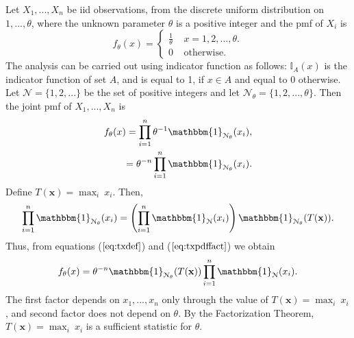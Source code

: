 \documentclass[a4paper,english,12pt]{article}
\newcommand{\bx}{\mathbf{x}}
\begin{document}
\begin{exmp}
Let $X_1,...,X_n$ be iid observations, from the discrete uniform distribution on $1,...,\theta$, where the unknown parameter $\theta$ is a positive integer and the pmf of $X_i$ is
\begin{equation*}
f_\theta(x) = 
\begin{cases} 
\frac{1}{\theta} ~~~~~ x=1,2,...,\theta. \\
0 ~~~~~\text{otherwise}.
\end{cases}
\end{equation*}
The analysis can be carried out using indicator function as follows:
$\mathbb{I}_A(x)$ is the indicator function of set $A$, and is equal to 1, if $x \in A$ and equal to 0 otherwise. Let $\mathcal{N} = \{1,2,...\}$ be the set of positive integers and let $\mathcal{N}_\theta =\{1,2,...,\theta \}$. Then the joint pmf of $X_1,...,X_n$ is 
\begin{eqnarray}
f_\theta(x) = \prod_{i=1}^{n}{\theta^{-1}\mathbbm{1}_{\mathcal{N}_\theta} (x_i)}, \nonumber \\
= \theta^{-n}\prod_{i=1}^{n}{\mathbbm{1}_{\mathcal{N}_\theta} (x_i)}.  \label{eq:txdef}
\end{eqnarray}
Define $T(\bx)=\displaystyle\max_i ~x_i$. Then,
\begin{eqnarray}
\prod_{i=1}^{n}{\mathbbm{1}_{\mathcal{N}_\theta} (x_i)}=\left(\prod_{i=1}^{n}{\mathbbm{1}_{\mathcal{N}} (x_i)}\right)\mathbbm{1}_{\mathcal{N}_\theta} (T(\bx)). \label{eq:txpdffact}
\end{eqnarray}
Thus, from equations ($ \ref{eq:txdef} $) and ($ \ref{eq:txpdffact} $) we obtain
\begin{equation}
f_\theta(x) = \theta^{-n}\mathbbm{1}_{\mathcal{N}_\theta} (T(\bx))\prod_{i=1}^{n}{\mathbbm{1}_{\mathcal{N}} (x_i)}.  
\end{equation}
The first factor depends on $x_1,...,x_n$ only through the value of $T(\bx)=\displaystyle\max_i ~x_i$, and second factor does not depend on $\theta$. By the Factorization Theorem, $T(\bx)=\displaystyle\max_i ~x_i$ is a sufficient statistic for $\theta$.
\end{exmp}
\end{document}
